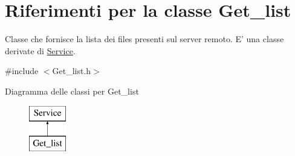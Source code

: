 \hypertarget{class_get__list}{\section{Riferimenti per la classe Get\-\_\-list}
\label{class_get__list}
}


Classe che fornisce la lista dei files presenti sul server remoto. E' una classe derivate di {\ttfamily \hyperlink{class_service}{Service}}.  




{\ttfamily \#include $<$Get\-\_\-list.\-h$>$}

Diagramma delle classi per Get\-\_\-list\begin{figure}[H]
\begin{center}
\leavevmode
\includegraphics[height=2.000000cm]{class_get__list}
\end{center}
\end{figure}
